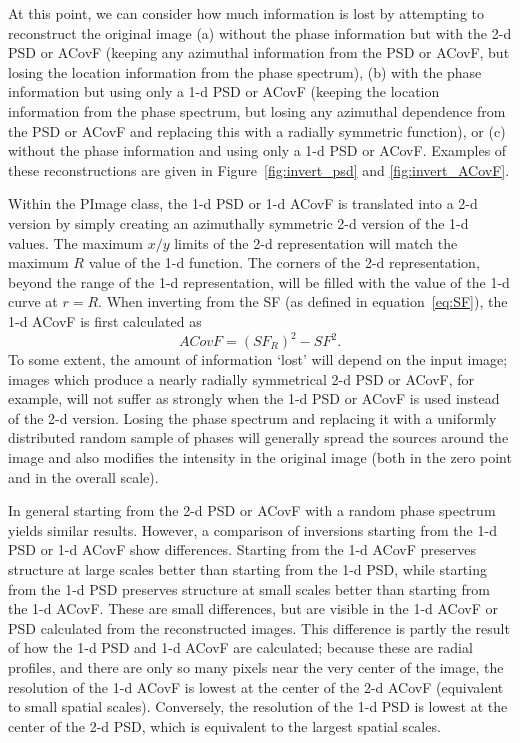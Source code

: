 \documentclass[11pt,preprint]{aastex}
\begin{document}
At this point, we can consider how much information is lost by attempting to reconstruct the original image (a) without the phase information but with the 2-d PSD or ACovF (keeping any azimuthal information from the PSD or ACovF, but losing the location information from the phase spectrum), (b) with the phase information but using only a 1-d PSD or ACovF (keeping the location information from the phase spectrum, but losing any azimuthal dependence from the PSD or ACovF and replacing this with a radially symmetric function), or (c) without the phase information and using only a 1-d PSD or ACovF.  Examples of these reconstructions are given in Figure~\ref{fig:invert_psd} and \ref{fig:invert_ACovF}. 

Within the PImage class, the 1-d PSD or 1-d ACovF is translated into a 2-d version by simply creating an azimuthally symmetric 2-d version of the 1-d values. The maximum $x/y$ limits of the 2-d representation will match the maximum $R$ value of the 1-d  function. The corners of the 2-d representation, beyond the range of the 1-d representation, will be filled with the value of the 1-d curve at $r=R$.  When inverting from the SF (as defined in equation~\ref{eq:SF}), the 1-d ACovF is first calculated as 
\begin{equation}
ACovF = (SF_R)^2 - SF^2.
\end{equation}
To some extent, the amount of information `lost' will depend on the input image; images which produce a nearly radially symmetrical 2-d PSD or ACovF, for example, will not suffer as strongly when the 1-d PSD or ACovF is used instead of the 2-d version. Losing the phase spectrum and replacing it with a uniformly distributed random sample of phases will generally spread the sources around the image and also modifies the intensity in the original image (both in the zero point and in the overall scale). 

In general starting from the 2-d PSD or ACovF with a random phase spectrum yields similar results. However, a comparison of inversions starting from the 1-d PSD or 1-d ACovF show differences. Starting from the 1-d ACovF preserves structure at large scales better than starting from the 1-d PSD, while starting from the 1-d PSD preserves structure at small scales better than starting from the 1-d ACovF. These are small differences, but are visible in the 1-d ACovF or PSD calculated from the reconstructed images.  This difference is partly the result of how the 1-d PSD and 1-d ACovF are calculated; because these are radial profiles, and there are only so many pixels near the very center of the image, the resolution of the 1-d ACovF is lowest at the center of the 2-d ACovF (equivalent to small spatial scales). Conversely, the resolution of the 1-d PSD is lowest at the center of the 2-d PSD, which is equivalent to the largest spatial scales. 
\end{document}
